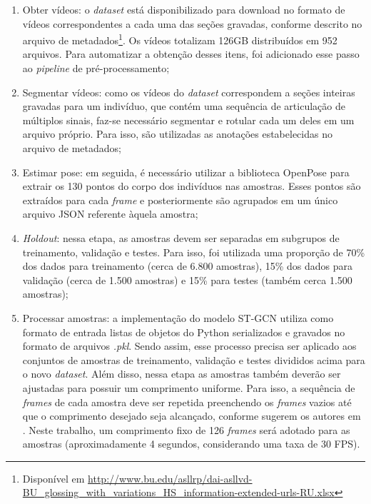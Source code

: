 \begin{enumerate}
    \item Obter vídeos: o \textit{dataset} está disponibilizado para download no formato de vídeos correspondentes a cada uma das seções gravadas, conforme descrito no arquivo de metadados\footnote{
        Disponível em \url{http://www.bu.edu/asllrp/dai-asllvd-BU_glossing_with_variations_HS_information-extended-urls-RU.xlsx}
    }. Os vídeos totalizam 126GB distribuídos em 952 arquivos. Para automatizar a obtenção desses itens, foi adicionado esse passo ao  \textit{pipeline} de pré-processamento;
    \item Segmentar vídeos: como os vídeos do \textit{dataset} correspondem a seções inteiras gravadas para um indivíduo, que contém uma sequência de articulação de múltiplos sinais, faz-se necessário segmentar e rotular cada um deles em um arquivo próprio. Para isso, são utilizadas as anotações estabelecidas no arquivo de metadados;
    \item Estimar pose: em seguida, é necessário utilizar a biblioteca OpenPose para extrair os 130 pontos do corpo dos indivíduos nas amostras. Esses pontos são extraídos para cada \textit{frame} e posteriormente são agrupados em um único arquivo JSON referente àquela amostra;
    \item \textit{Holdout}: nessa etapa, as amostras devem ser separadas em subgrupos de treinamento, validação e testes. Para isso, foi utilizada uma proporção de 70\% dos dados para treinamento (cerca de 6.800 amostras), 15\% dos dados para validação (cerca de 1.500 amostras) e 15\% para testes (também cerca 1.500 amostras);
    \item Processar amostras: a implementação do modelo ST-GCN utiliza como formato de entrada listas de objetos do Python serializados e gravados no formato de arquivos \textit{.pkl}. Sendo assim, esse processo precisa ser aplicado aos conjuntos de amostras de treinamento, validação e testes divididos acima para o novo \textit{dataset}. Além disso, nessa etapa as amostras também deverão ser ajustadas para possuir um comprimento uniforme. Para isso, a sequência de \textit{frames} de cada amostra deve ser repetida preenchendo os \textit{frames} vazios até que o comprimento desejado seja alcançado, conforme sugerem os autores em \cite{st-gcn-2018}. Neste trabalho, um comprimento fixo de 126 \textit{frames} será adotado para as amostras (aproximadamente 4 segundos, considerando uma taxa de 30 FPS).
\end{enumerate}

